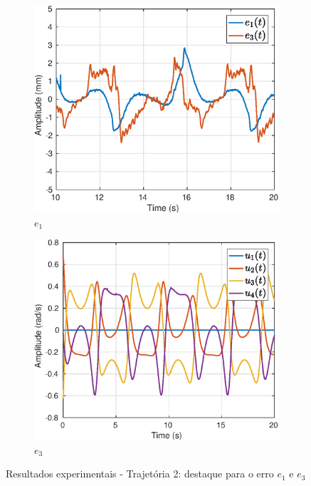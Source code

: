 \begin{figure}[H]
\centering
\begin{subfigure}{.5\textwidth}
  \centering
  \includegraphics[width=\linewidth]{./img/traj_2_k5/error.eps}
  \caption{$e_1$}
  \label{fig:sub1}
\end{subfigure}%
\begin{subfigure}{.5\textwidth}
  \centering
  \includegraphics[width=\linewidth]{./img/traj_2_k5/u.eps}
  \caption{$e_3$}
  \label{fig:sub2}
\end{subfigure}
\caption{Resultados experimentais - Trajetória 2: destaque para o erro $e_1$ e $e_3$}
\label{fig:erro_traj}
\end{figure}


